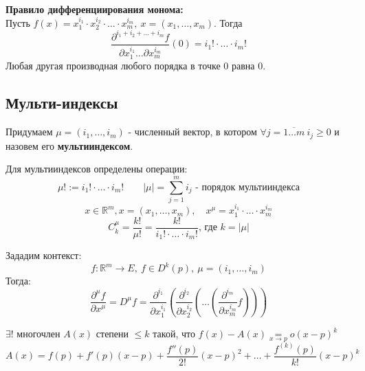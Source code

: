 \textbf{Правило дифференциирования монома:\\}
\bigskip
Пусть $f(x)  = x_1^{i_1} \cdot x_2^{i_2} \cdot \dots \cdot x_m^{i_m}, \ x = (x_1, \dots, x_m)$. Тогда 
\[\frac{\partial^{i_1+i_2+ \dots + i_m} f}{\partial x_1^{i_1} \dots \partial x_m^{i_m}}(0) = i_1! \cdot \hdots \cdot i_m!\]
Любая другая производная любого порядка в точке $0$ равна $0$.

\subsection{Мульти-индексы}
Придумаем $\mu = (i_1, \hdots, i_m)$ - численный вектор, в котором $\forall j = \overline{1 \hdots m} \ i_j \geq 0$ и назовем его \textbf{мультииндексом}.
\par
Для мультииндексов определены операции:
\[\mu! := i_1! \cdot \hdots \cdot  i_m! \qquad \left| \mu \right| = \sum_{j = 1}^{m} i_j \text{ - порядок мультииндекса}\]
\[x \in \mathbb{R}^m, x = (x_1, \hdots, x_m), \quad x^{\mu} = x_1^{i_1} \cdot \hdots \cdot x_m^{i_m}\]
\[C^{\mu}_k = \frac{k!}{\mu!} = \frac{k!}{i_1!\cdot \hdots \cdot i_m!} \text{, где } k = \left|\mu\right|\]

\bigskip

Зададим контекст:
\[f:\mathbb{R}^m \to E, \ f \in D^k(p), \ \mu = (i_1, \hdots, i_m)\]
Тогда:
\[\frac{\partial^{\mu}f}{\partial x^{\mu}} = D^{\mu}f = \frac{\partial^{i_1}}{\partial x_1^{i_1}}(\frac{\partial^{i_2}}{\partial x_2^{i_2}}( \hdots (\frac{\partial^{i_m}}{\partial x_m^{i_m}}f)))\]

\begin{theorem*}
    $\exists!$ многочлен $A(x)$ степени $\leq k$ такой, что $f(x) - A(x) \underset{x \to p}{=} o(x-p)^k$    
    \[A(x) = f(p) + f'(p)(x-p) + \frac{f''(p)}{2!}(x-p)^2 + \hdots + \frac{f^{(k)}(p)}{k!}(x-p)^k\]
\end{theorem*}

